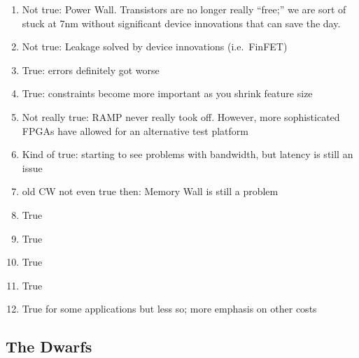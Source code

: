 \begin{enumerate}
    \item Not true: Power Wall. Transistors are no longer really ``free;''  we are sort of stuck at 7nm without significant device innovations that can save the day.
    \item Not true: Leakage solved by device innovations (i.e.\ FinFET)
    \item True: errors definitely got worse
    \item True: constraints become more important as you shrink feature size
    \item Not really true: RAMP never really took off. However, more sophisticated FPGAs have allowed for an alternative test platform
    \item Kind of true: starting to see problems with bandwidth, but latency is still an issue
    \item old CW not even true then: Memory Wall is still a problem
    \item True
    \item True
    \item True
    \item True
    \item True for some applications but less so; more emphasis on other costs
\end{enumerate}

\subsection{The Dwarfs}\label{feb-11:a-view:dwarfs}

